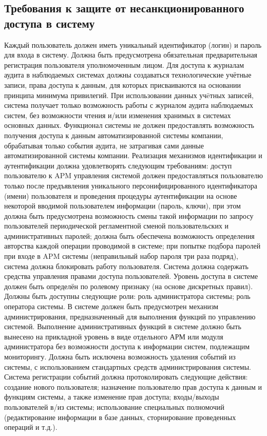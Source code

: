 \subsection{Требования к защите от несанкционированного доступа в систему}
Каждый пользователь должен иметь уникальный идентификатор (логин) и пароль для входа в систему. Должна быть предусмотрена обязательная предварительная  регистрация пользователя уполномоченным лицом. Для доступа к журналам аудита в наблюдаемых системах должны создаваться технологические учётные записи, права доступа к данным, для которых присваиваются на основании принципа минимума привилегий. При использовании данных учëтных записей, система получает только возможность работы с журналом аудита наблюдаемых систем, без возможности чтения и/или изменения хранимых в системах основных данных. Функционал системы не должен предоставлять возможность получения доступа к данным автоматизированной системы компании, обрабатывая только события аудита, не затрагивая сами данные автоматизированной системы компании. Реализация механизмов идентификации и аутентификации должна удовлетворять следующим требованиям: доступ пользователю к APM управления системой должен предоставляться пользователю только после предъявления уникального персонифицированного идентификатора (имени) пользователя и проведения процедуры аутентификации на основе некоторой вводимой пользователем информации (пароль, ключи), при этом должна быть предусмотрена возможность смены такой информации по запросу пользователей периодической регламентной сменой пользовательских и административных паролей; должна быть обеспечена возможность определения авторства каждой операции проводимой в системе; при попытке подбора паролей при входе в APM системы (неправильный набор пароля три раза подряд), система должна блокировать работу пользователя. Система должна содержать средства управления правами доступа пользователей. Уровень доступа в системе должен быть определён по ролевому признаку (на основе дискретных правил). Должны быть доступны следующие роли: роль администратора системы; роль оператора системы. В системе должен быть предусмотрен механизм администрирования, предназначенный для выполнения функций по управлению системой. Выполнение административных функций в системе должно быть вынесено на прикладной уровень в виде отдельного АРМ или модуля администратора без возможности доступа к информации систем, подлежащим мониторингу. Должна быть исключена возможность удаления событий из системы, с использованием стандартных средств администрирования системы. Система регистрации событий должна протоколировать следующие действия: создание нового пользователя; назначение пользователю прав доступа к данным и функциям системы, а также изменение прав доступа; входы/выходы пользователей в/из системы; использование специальных полномочий (редактирование информации в базе данных, сторнирование проведенных операций и т.д.).

